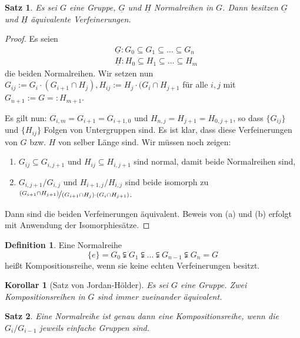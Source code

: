 \documentclass[12pt]{scrartcl}%
\newtheorem{thm}{Satz}
\newtheorem{kor}{Korollar}
\theoremstyle{definition}
\newtheorem*{defn}{Definition}
\theoremstyle{remark}
\begin{document}
\begin{thm}
Es sei $G$ eine Gruppe, $\underline{G}$ und $\underline{H}$ Normalreihen in $G$. Dann besitzen $\underline{G}$ und $\underline{H}$ äquivalente Verfeinerungen.
\end{thm}

\begin{proof}
    Es seien 
    \[\begin{split}
            &\underline{G}: G_0\subseteq G_1 \subseteq\dots\subseteq G_n \\
            &\underline{H}: H_0\subseteq H_1\subseteq\dots\subseteq H_m 
        \end{split}\]
    die beiden Normalreihen. Wir setzen nun $G_{ij}:=G_i\cdot(G_{i+1}\cap H_j), H_{ij} := H_j\cdot(G_i\cap H_{j+1}$ für alle $i,j$ mit $G_{n+1}:=G=:H_{m+1}$.
    
    Es gilt nun: $G_{i,m}=G_{i+1}=G_{i+1,0}$ und $H_{n,j}=H_{j+1}=H_{0,j+1}$, so dass $\{G_{ij}\}$ und $\{H_{ij}\}$ Folgen von Untergruppen sind. Es ist klar, dass diese Verfeinerungen von $G$ bzw. $H$ von selber Länge sind. Wir müssen noch zeigen:
    \begin{enumerate}[label=(\alph*)]
        \item $G_{ij}\subseteq G_{i,j+1}$ und $H_{ij}\subseteq H_{i,j+1}$ sind normal, damit beide Normalreihen sind,
        \item $G_{i,j+1}/G_{i,j}$ und $H_{i+1,j}/H_{i,j}$ sind beide isomorph zu $\nicefrac{(G_{i+1}\cap H_{j+1})}{(G_{i+1}\cap H_{j})\cdot(G_{i}\cap H_{j+1})}$.
    \end{enumerate}
    Dann sind die beiden Verfeinerungen äquivalent. Beweis von (a) und (b) erfolgt mit Anwendung der Isomorphiesätze.
\end{proof}

\begin{defn}
    Eine Normalreihe 
        \[\{e\}=G_0\subsetneqq G_1 \subsetneqq\dots\subsetneqq G_{n-1}\subsetneqq G_n=G \]
    heißt Kompositionsreihe, wenn sie keine echten Verfeinerungen besitzt.
\end{defn}

\begin{kor}[Satz von Jordan-Hölder]
    Es sei $G$ eine Gruppe. Zwei Kompositionsreihen in $G$ sind immer zueinander äquivalent.
\end{kor}

\begin{thm}
    Eine Normalreihe ist genau dann eine Kompositionsreihe, wenn die $G_i/G_{i-1}$ jeweils einfache Gruppen sind.
\end{thm}
\end{document}
